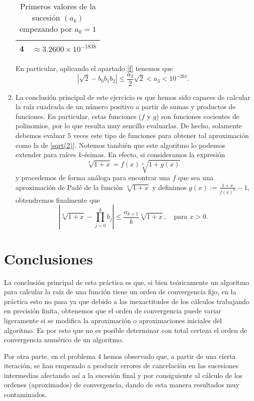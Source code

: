 \documentclass[a4paper]{article}
\begin{document}
\begin{enumerate}
\begin{table}[ht]
\begin{tabular}{|c|c|}
            \hline
            4 & $\approx3.2600\times10^{-1838}$ \\
            \hline
        \end{tabular}
        \caption{Primeros valores de la sucesión $(a_k)$ empezando por $a_0=1$}
        \label{pade}
    \end{table}
    En particular, aplicando el apartado \ref{f} tenemos que \begin{equation}
        \left|\sqrt{2}-b_0b_1b_2\right|\leq\frac{a_3}{2}\sqrt{2}< a_3<10^{-261}.
        \label{sqrt(2)}
    \end{equation}
    \item La conclusión principal de este ejercicio es que hemos sido capaces de calcular la raíz cuadrada de un número positivo a partir de sumas y productos de funciones. En particular, estas funciones ($f$ y $g$) son funciones cocientes de polinomios, por lo que resulta muy sencillo evaluarlas. De hecho, solamente debemos evaluar 5 veces este tipo de funciones para obtener tal aproximación como la de \eqref{sqrt(2)}. Notemos también que este algoritmo lo podemos extender para raíces $k$-ésimas. En efecto, si consideramos la expresión 
    \begin{equation}
        \sqrt[k]{1+x}=f(x)\sqrt[k]{1+g(x)}
    \end{equation}
    y procedemos de forma análoga para encontrar una $f$ que sea una aproximación de Padé de la función $\sqrt[k]{1+x}$ y definimos $g(x):=\frac{1+x}{f(x)^k}-1$, obtendremos finalmente que $$\left|\sqrt[k]{1+x}-\prod_{j=0}^kb_j\right|\leq\frac{a_{k+1}}{k}\sqrt[k]{1+x},\quad\text{para }x>0.$$
\end{enumerate}
\newpage
\section*{Conclusiones} 
La conclusión principal de esta práctica es que, si bien teóricamente un algoritmo para calcular la raíz de una función tiene un orden de convergencia fijo, en la práctica esto no pasa ya que debido a las inexactitudes de los cálculos trabajando en precisión finita, obtenemos que el orden de convergencia puede variar ligeramente si se modifica la aproximación o aproximaciones iniciales del algoritmo. Es por esto que no es posible determinar con total certeza el orden de convergencia numérico de un algoritmo.\par Por otra parte, en el problema 4 hemos observado que, a partir de una cierta iteración, se han empezado a producir errores de cancelación en las sucesiones intermedias afectando así a la sucesión final y por consiguiente al cálculo de los ordenes (aproximados) de convergencia, dando de esta manera resultados muy contaminados. 
\end{document}
